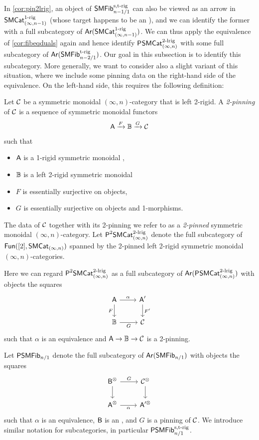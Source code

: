 \documentclass[a4paper,11pt]{article}
\begin{document}
In \cref{cor:pin2lrig}, an object of $\SMFibstrig_{n-1/1}$ can also be viewed as an arrow in $\SMCat_{(\infty,n-1)}^{\orig}$ (whose
target happens to be an \icat{}), and we can identify the former with a
full subcategory of $\Ar(\SMCat_{(\infty,n-1)}^{\orig})$. We
can thus apply the equivalence of \cref{cor:fibeqduals} again and hence
identify $\PSMCatIntworig$ with some full subcategory of
$\Ar(\SMFibtrig_{n-2/1})$. Our goal in this subsection is to 
identify this subcategory. More generally, we want to consider also a slight
variant of this situation, where we include some pinning data
on the right-hand side of the equivalence. On the left-hand side,
this requires the following definition:
\begin{defn}
  Let $\nC$ be a symmetric monoidal $(\infty,n)$-category that is left
  2-rigid. A
  \emph{2-pinning} of $\nC$ is a sequence of symmetric monoidal
  functors
  \[ \oA \xto{F} \tB \xto{G} \nC\]
  such that
  \begin{itemize}
  \item $\oA$ is a 1-rigid symmetric monoidal \icat{},
  \item $\tB$ is a left 2-rigid symmetric monoidal \itcat{}
  \item $F$ is essentially surjective on objects,
  \item $G$ is essentially surjective on objects and
    1-morphisms.
  \end{itemize}
  The data of $\nC$ together with its 2-pinning we refer to as a
  \emph{2-pinned} symmetric monoidal $(\infty,n)$-category.  Let
  $\PSMCatIn[2]^{2\dlrig}$ denote the full subcategory of
  $\Fun([2], \SMCatIn)$ spanned by the 2-pinned left 2-rigid
  symmetric monoidal $(\infty,n)$-categories.
\end{defn}

\begin{observation}
  Here we can regard $\PSMCatIn[2]^{2\dlrig}$ as a full
  subcategory of $\Ar(\PSMCatIn^{2\dlrig})$ with objects the squares
  \[
    \begin{tikzcd}
     \oA \ar[r, "\alpha"] \ar[d, "F"'] & \oA'  \ar[d, "F'"] \\
     \tB \ar[r, "G"'] & \nC
    \end{tikzcd}
  \]
  such that $\alpha$ is an equivalence and
  $\oA \to \tB \to \nC$ is a 2-pinning.
\end{observation}

\begin{notation}
  Let $\PSMFib_{n/1}$ denote the full subcategory of
  $\Ar(\SMFib_{n/1})$ with objects the squares
    \[
    \begin{tikzcd}
     \oB^{\otimes} \ar[r, "G"] \ar[d] & \nC^{\otimes}  \ar[d] \\
     \oA^{\otimes} \ar[r, "\alpha"'] & \oA'^{\otimes}
    \end{tikzcd}
  \]
  such that $\alpha$ is an equivalence, $\oB$ is an \icat{}, and $G$
  is a pinning of $\nC$. We introduce similar notation for
  subcategories, in particular $\PSMFibstrig_{n/1}$. 
\end{notation}
\end{document}
